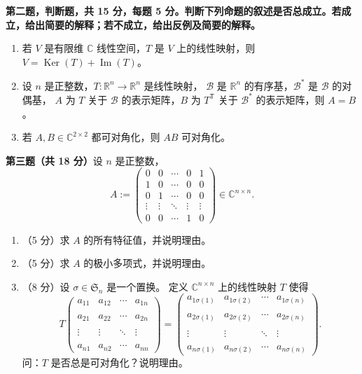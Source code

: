 \textbf{第二题，判断题，共 15 分，每题 5 分。判断下列命题的叙述是否总成立。若成立，给出简要的解释；若不成立，给出反例及简要的解释。}
\begin{enumerate}
\item 若 $V$ 是有限维 $\mathbb{C}$ 线性空间，$T$ 是 $V$ 上的线性映射，则 $V=\operatorname{Ker}(T)+\operatorname{Im}(T)$。
\item 设 $n$ 是正整数，$T: \mathbb{R}^{n} \rightarrow \mathbb{R}^{n}$ 是线性映射，
$\mathcal{B}$ 是 $\mathbb{R}^{n}$ 的有序基，$\mathcal{B}^{*}$ 是 $\mathcal{B}$ 的对偶基，
$A$ 为 $T$ 关于 $\mathcal{B}$ 的表示矩阵，$B$ 为 $T^{\mathsf{T}}$ 关于 $\mathcal{B}^{*}$ 的表示矩阵，则 $A=B$。
\item 若 $A, B \in \mathbb{C}^{2 \times 2}$ 都可对角化，则 $AB$ 可对角化。
\end{enumerate}

\textbf{第三题（共 18 分）}设 $n$ 是正整数，
$$A:=\begin{pmatrix}
0 & 0 & \cdots & 0 & 1 \\
1 & 0 & \cdots & 0 & 0 \\
0 & 1 & \cdots & 0 & 0 \\
\vdots & \vdots & \ddots & \vdots & \vdots \\
0 & 0 & \cdots & 1 & 0
\end{pmatrix} \in \mathbb{C}^{n \times n}.$$
\begin{enumerate}
\item（5 分）求 $A$ 的所有特征值，并说明理由。
\item（5 分）求 $A$ 的极小多项式，并说明理由。
\item（8 分）设 $\sigma \in \mathfrak{S}_{n}$ 是一个置换。
定义 $\mathbb{C}^{n \times n}$ 上的线性映射 $T$ 使得
$$T\begin{pmatrix}
a_{11} & a_{12} & \cdots & a_{1n} \\ \\
a_{21} & a_{22} & \cdots & a_{2n} \\ \\
\vdots & \vdots & \ddots & \vdots \\ \\
a_{n1} & a_{n2} & \cdots & a_{nn}
\end{pmatrix}=\begin{pmatrix}
a_{1\sigma(1)} & a_{1\sigma(2)} & \cdots & a_{1\sigma(n)} \\ \\
a_{2\sigma(1)} & a_{2\sigma(2)} & \cdots & a_{2\sigma(n)} \\ \\
\vdots & \vdots & \ddots & \vdots \\ \\
a_{n\sigma(1)} & a_{n\sigma(2)} & \cdots & a_{n\sigma(n)}
\end{pmatrix}.$$
问：$T$ 是否总是可对角化？说明理由。
\end{enumerate}


